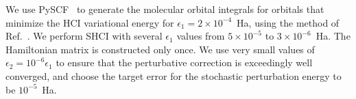 \documentclass[%
reprint,
 superscriptaddress,
 amsmath,amssymb,
 aps,
]{revtex4-1}
\begin{document}
We use PySCF~\cite{SunCha_etal_PySCF-ComMolSci-18} to generate the molecular orbital integrals for orbitals that minimize the HCI variational
energy for $\epsilon_1=2\times 10^{-4}$~Ha, using the method of Ref.~\cite{SmiMusHolSha-JCTC-17}.
We perform SHCI with several $\epsilon_1$ values from $5\times10^{-5}$ to $3\times10^{-6}$~Ha.
The Hamiltonian matrix is constructed only once.
We use very small values of $\epsilon_2 = 10^{-6} \epsilon_1$  to ensure that the perturbative correction is exceedingly well converged,
and choose the target error for the stochastic perturbation energy to be $10^{-5}$~Ha.
\end{document}

